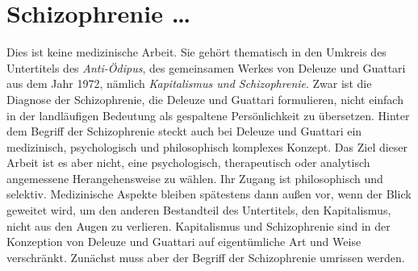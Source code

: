 \documentclass[12pt,
               paper=a4,
               twoside=false,
               onehalfspacing,
               bibliography=totoc,
               toc=graduated,
               ]{scrartcl}
\newcommand{\worries}[1]{\ifdraft{\textcolor{blue}{\texttt{(#1)}}}{}}
\newcommand{\dg}{Deleuze und Guattari\xspace}
\begin{document}

\section{Schizophrenie \dots}


Dies ist keine medizinische Arbeit. Sie gehört thematisch in den
Umkreis des Untertitels des \emph{Anti-Ödipus}, des gemeinsamen Werkes
von \dg aus dem Jahr 1972, nämlich \emph{Kapitalismus und
Schizophrenie}. Zwar ist die Diagnose der Schizophrenie, die Deleuze
und Guattari formulieren, nicht einfach in der landläufigen Bedeutung
als \glq gespaltene Persönlichkeit\grq{} zu übersetzen. Hinter dem
Begriff der Schizophrenie steckt auch bei Deleuze und Guattari ein
medizinisch, psychologisch und philosophisch komplexes Konzept. Das
Ziel dieser Arbeit ist es aber nicht, eine psychologisch,
therapeutisch oder analytisch angemessene Herangehensweise zu wählen.
Ihr Zugang ist philosophisch und selektiv. Medizinische Aspekte
bleiben spätestens dann außen vor, wenn der Blick geweitet wird, um
den anderen Bestandteil des Untertitels, den Kapitalismus, nicht aus
den Augen zu verlieren. Kapitalismus und Schizophrenie sind in der
Konzeption von \dg auf eigentümliche Art und Weise verschränkt.
Zunächst muss aber der Begriff der Schizophrenie umrissen werden.
\end{document}
